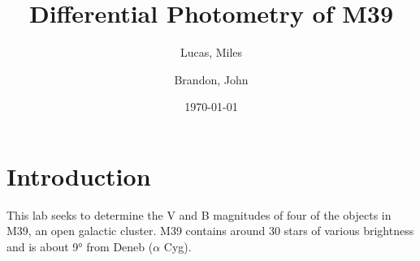 \documentclass[%
aip,
jmp,
reprint,
floatfix
]{revtex4-1}
\begin{document}
	\title[Photometry of M39]{Differential Photometry of M39}

	\author{Lucas, Miles}
	\author{Brandon, John}

	\date{\today}



	\begin{abstract}


	\end{abstract}

	\maketitle


	\section{Introduction}

	This lab seeks to determine the V and B magnitudes of four of the objects in M39, an open galactic cluster. M39 contains around 30 stars of various brightness and is about \ang{9} from Deneb ($\alpha$ Cyg).


\end{document}
